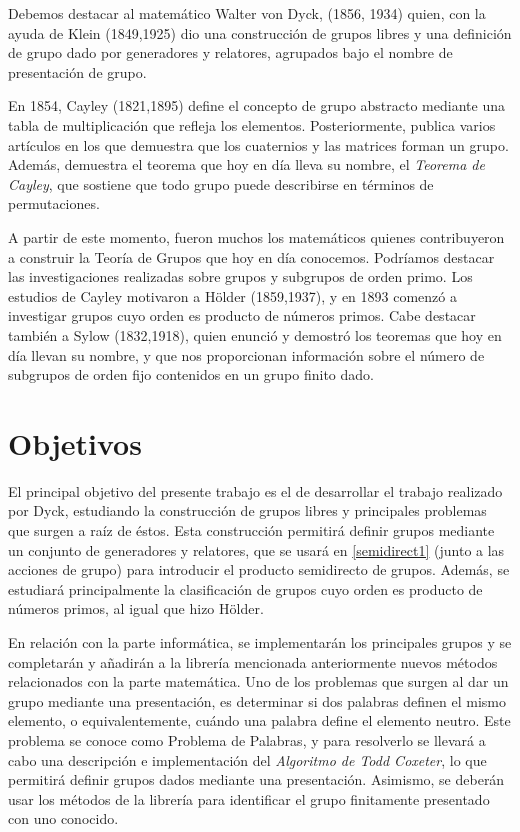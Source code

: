 Debemos destacar al matemático Walter von Dyck, (1856, 1934) quien, con la ayuda de Klein (1849,1925) dio una construcción de grupos libres y una definición de grupo dado por generadores y relatores, agrupados bajo el nombre de presentación de grupo.

En 1854, Cayley (1821,1895) define el concepto de grupo abstracto mediante una tabla de multiplicación que refleja los elementos. Posteriormente, publica varios artículos en los que demuestra que los cuaternios y las matrices forman un grupo. Además, demuestra el teorema que hoy en día lleva su nombre, el \textit{Teorema de Cayley}, que sostiene que todo grupo puede describirse en términos de permutaciones.

A partir de este momento, fueron muchos los matemáticos quienes contribuyeron a construir la Teoría de Grupos que hoy en día conocemos.  Podríamos destacar las investigaciones realizadas sobre grupos y subgrupos de orden primo.  Los estudios de Cayley motivaron a Hölder (1859,1937), y en 1893 comenzó a investigar grupos cuyo orden es producto de números primos. Cabe destacar también a Sylow (1832,1918), quien enunció y demostró los teoremas que hoy en día llevan su nombre, y que nos proporcionan información sobre el número de subgrupos de orden fijo contenidos en un grupo finito dado.




\section{Objetivos}
El principal objetivo del presente trabajo es el de desarrollar el trabajo realizado por Dyck, estudiando la construcción de grupos libres y principales problemas que surgen a raíz de éstos. Esta construcción  permitirá definir grupos mediante un conjunto de generadores y relatores, que se usará en \ref{semidirect1} (junto a las acciones de grupo) para introducir el producto semidirecto de grupos. Además, se estudiará principalmente la clasificación de grupos cuyo orden es producto de números primos, al igual que hizo Hölder.


En relación con la parte informática, se implementarán los principales grupos y se completarán y añadirán a la librería mencionada anteriormente nuevos métodos relacionados con la parte matemática.
Uno de los problemas que surgen al dar un grupo mediante una presentación, es determinar si dos palabras definen el mismo elemento, o equivalentemente, cuándo una palabra define el elemento neutro. Este problema se conoce como Problema de Palabras, y para resolverlo se llevará a cabo una descripción e implementación del \textit{Algoritmo de Todd Coxeter}, lo que  permitirá definir grupos dados mediante una presentación. Asimismo, se deberán usar los métodos de la librería para identificar el grupo finitamente presentado con uno conocido.





